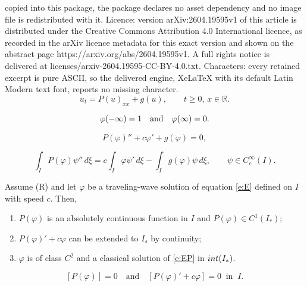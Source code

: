\documentclass[10pt,a4paper]{amsart}
\newcommand{\R}{\mathbb R}
\renewcommand{\phi}{\varphi}
\begin{document}
copied into this package, the package declares no asset dependency and no image file is redistributed with it. Licence: version arXiv:2604.19595v1 of this article is distributed under the Creative Commons Attribution 4.0 International licence, as recorded in the arXiv licence metadata for this exact version and shown on the abstract page https://arxiv.org/abs/2604.19595v1. A full rights notice is delivered at licenses/arxiv-2604.19595-CC-BY-4.0.txt. Characters: every retained excerpt is pure ASCII, so the delivered engine, XeLaTeX with its default Latin Modern text font, reports no missing character.
\begin{equation}\label{e:E}
u_t =P(u)_{xx} + g(u), \qquad t\ge 0, \, x\in \R.
\end{equation}

\begin{equation} \label{e:phi-limits}
\phi(-\infty)=1\quad \hbox{and}\quad \phi(\infty)=0.
\end{equation}

\begin{equation}\label{e:EP}
P(\phi)''+c\phi'+g(\phi)=0,
\end{equation}

\begin{equation}\label{e:solution}
\int_I P(\phi)\psi''\, d\xi = c\int_I \phi\psi'\, d\xi -\int_I g(\phi)\psi\, d\xi, \qquad \psi\in C_c^\infty(I).
\end{equation}

\begin{proposition}\label{p:Pconditions}
Assume {\rm (R)} and let $\phi$ be a traveling-wave solution of equation \eqref{e:E} defined on $I$ with speed $c$. Then, 
\begin{enumerate}[label=(\roman*)]
\item $P(\phi)$ is an absolutely continuous function in $I$ and $P(\phi) \in C^1(I_*)$;
\item $P(\phi)'+c\phi$ can be extended to $I_{s}$ by continuity;  
\item $\phi$ is of class $C^2$ and a classical solution of \eqref{e:EP} in ${\rm int}(I_*)$.
\end{enumerate}
\end{proposition}

\begin{equation}\label{e:llsk}
\left[P(\phi)\right]=0 \quad \text{and} \quad  \left[P(\phi)'+c\phi\right]=0 \ \mbox{ in } \ I.
\end{equation}
\end{document}
